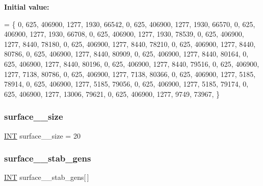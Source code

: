{\bfseries Initial value\+:}
\begin{DoxyCode}
= \{ 
    0, 625, 406900, 1277, 1930, 66542, 
    0, 625, 406900, 1277, 1930, 66570, 
    0, 625, 406900, 1277, 1930, 66708, 
    0, 625, 406900, 1277, 1930, 78539, 
    0, 625, 406900, 1277, 8440, 78180, 
    0, 625, 406900, 1277, 8440, 78210, 
    0, 625, 406900, 1277, 8440, 80786, 
    0, 625, 406900, 1277, 8440, 80909, 
    0, 625, 406900, 1277, 8440, 80164, 
    0, 625, 406900, 1277, 8440, 80196, 
    0, 625, 406900, 1277, 8440, 79516, 
    0, 625, 406900, 1277, 7138, 80786, 
    0, 625, 406900, 1277, 7138, 80366, 
    0, 625, 406900, 1277, 5185, 78914, 
    0, 625, 406900, 1277, 5185, 79056, 
    0, 625, 406900, 1277, 5185, 79174, 
    0, 625, 406900, 1277, 13006, 79621, 
    0, 625, 406900, 1277, 9749, 73967, 
\}
\end{DoxyCode}
\mbox{\label{surface__25_8_c_a205641b28b7d23e595dc307e6028bc9e}} 
\subsubsection{\texorpdfstring{surface\+\_\+\_\+size}{surface\_25\_size}}
{\footnotesize\ttfamily \mbox{\hyperlink{galois_8h_a09fddde158a3a20bd2dcadb609de11dc}{I\+NT}} surface\+\_\+\_\+size = 20}

\mbox{\label{surface__25_8_c_a7c7e4fe1130a10cb0697215d787076fb}} 
\subsubsection{\texorpdfstring{surface\+\_\+\_\+stab\+\_\+gens}{surface\_25\_stab\_gens}}
{\footnotesize\ttfamily \mbox{\hyperlink{galois_8h_a09fddde158a3a20bd2dcadb609de11dc}{I\+NT}} surface\+\_\+\_\+stab\+\_\+gens\mbox{[}$\,$\mbox{]}}

\mbox{\label{surface__25_8_c_a15eff2145d28e9d0b1e4b06b9f630391}} 
